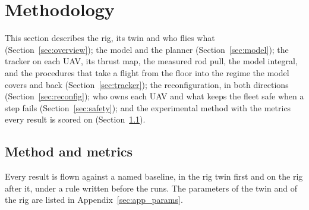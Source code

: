 \section{Methodology}
\label{sec:method}


This section describes the rig, its twin and who flies what (Section~\ref{sec:overview}); the model and the
planner (Section~\ref{sec:model}); the tracker on each UAV, its thrust map, the measured rod pull, the model
integral, and the procedures that take a flight from the floor into the regime the model covers and back
(Section~\ref{sec:tracker}); the reconfiguration, in both directions (Section~\ref{sec:reconfig}); who owns each
UAV and what keeps the fleet safe when a step fails (Section~\ref{sec:safety}); and the experimental method with
the metrics every result is scored on (Section~\ref{sec:experiments}).













\subsection{Method and metrics}
\label{sec:experiments}

Every result is flown against a named baseline, in the rig twin first and on the rig after it, under a rule
written before the runs. The parameters of the twin and of the rig are listed in Appendix~\ref{sec:app_params}.






